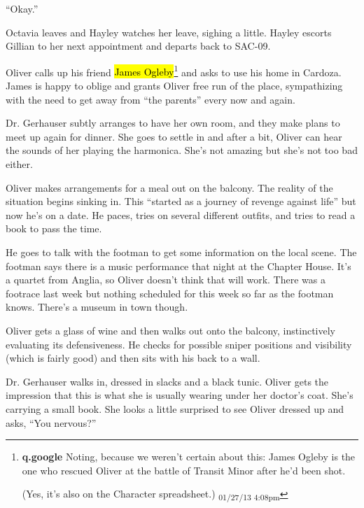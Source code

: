 ``Okay.''



Octavia leaves and Hayley watches her leave, sighing a little.  Hayley escorts Gillian to her next appointment and departs back to SAC-09.



Oliver calls up his friend \hl{James Ogleby}\footnote{\textbf{q.google }Noting, because we weren't certain about this: James Ogleby is the one who rescued Oliver at the battle of Transit Minor after he'd been shot.

(Yes, it's also on the Character spreadsheet.) \textsubscript{01/27/13 4:08pm}} and asks to use his home in Cardoza.  James is happy to oblige and grants Oliver free run of the place, sympathizing with the need to get away from ``the parents'' every now and again.



Dr. Gerhauser subtly arranges to have her own room, and they make plans to meet up again for dinner.  She goes to settle in and after a bit, Oliver can hear the sounds of her playing the harmonica.  She's not amazing but she's not too bad either.  



Oliver makes arrangements for a meal out on the balcony.  The reality of the situation begins sinking in.  This ``started as a journey of revenge against life'' but now he's on a date.  He paces, tries on several different outfits, and tries to read a book to pass the time.  



He goes to talk with the footman to get some information on the local scene.  The footman says there is a music performance that night at the Chapter House.  It's a quartet from Anglia, so Oliver doesn't think that will work.  There was a footrace last week but nothing scheduled for this week so far as the footman knows.  There's a museum in town though.



Oliver gets a glass of wine and then walks out onto the balcony, instinctively evaluating its defensiveness.  He checks for possible sniper positions and visibility (which is fairly good) and then sits with his back to a wall.



Dr. Gerhauser walks in, dressed in slacks and a black tunic.  Oliver gets the impression that this is what she is usually wearing under her doctor's coat.  She's carrying a small book.  She looks a little surprised to see Oliver dressed up and asks, ``You nervous?''

